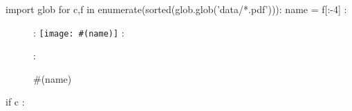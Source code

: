 \documentclass[a4]{article}
\begin{document}
{%
import glob
for c,f in enumerate(sorted(glob.glob('data/*.pdf'))):
    name = f[:-4]
    : \begin{figure}[p]
    : \texttt{[image: \#(name)]}
    : \caption{#(name)}
    : \end{figure}
    if c%
        : \clearpage
}%
\end{document}

